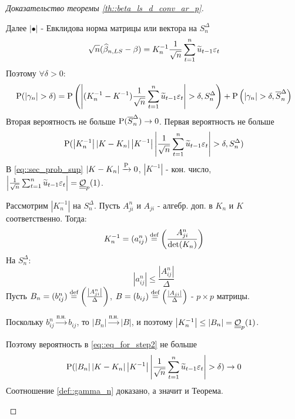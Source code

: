 \begin{proof}[Доказательство теоремы \ref{th::beta_ls_d_conv_ar_p}]
\begin{enumerate}
        Далее $\left\lvert \bullet\right\rvert $ - Евклидова норма матрицы или вектора на $S_n^\Delta$
        \[\sqrt{n}(\widehat{\beta}_{n,LS}-\beta)=K^{-1}_n\frac{1}{\sqrt{n}}\sum_{t=1}^n\widetilde{u}_{t-1}\eps_t\]
        Поэтому $\forall\delta>0$:
        \[\P(\left\lvert \gamma_n\right\rvert >\delta)=\P\left(\left\lvert (K^{-1}_n-K^{-1})\frac{1}{\sqrt{n}}\sum_{t=1}^n\widetilde{u}_{t-1}\eps_t\right\rvert >\delta,S_n^\Delta\right)+\P\left(\left\lvert \gamma_n\right\rvert >\delta,\overline{S}_n^\Delta\right)\]
        Вторая вероятность не больше $\P(\overline{S}_n^\Delta)\rightarrow0$. Первая вероятность
        не больше
        \begin{equation} \label{eq::sec_prob_sup}
            \P(\left\lvert K_n^{-1}\right\rvert \left\lvert K-K_n\right\rvert \left\lvert K^{-1}\right\rvert \left\lvert \frac{1}{\sqrt{n}}\sum_{t=1}^n\widetilde{u}_{t-1}\eps_t\right\rvert >\delta, S_n^\Delta)
        \end{equation}
        В \eqref{eq::sec_prob_sup} $\left\lvert K-K_n\right\rvert \xrightarrow{\P}0$, $\left\lvert K^{-1}\right\rvert $ - кон. число, $\left\lvert \frac{1}{\sqrt{n}}\sum_{t=1}^n\widetilde{u}_{t-1}\eps_t\right\rvert =\bigO_p(1)$.

        Рассмотрим $\left\lvert K_n^{-1}\right\rvert $ на $S_n^\Delta$. Пусть $A_{ji}^n$ и $A_{ji}$ - алгебр. доп. в $K_n$ и $K$ соответственно.
        Тогда:
        \[K_n^{-1}=(a_{ij}^n)\defeq\left(\frac{A_{ji}^n}{\det(K_n)}\right)\]
        На $S_n^\Delta$:
        \[\left\lvert a^n_{ij}\right\rvert \leq\frac{\left\lvert A_{ij}^n\right\rvert }{\Delta}\]
        Пусть $B_n=(b_{ij}^n)\defeq\left(\frac{\left\lvert A_{ji}^n\right\rvert }{\Delta}\right)$, $B=(b_{ij})\defeq\left(\frac{\left\lvert A_{ji}\right\rvert }{\Delta}\right)$ - $p\times p$ матрицы.

        Поскольку $b^n_{ij}\xrightarrow{\text{п.н.}}b_{ij}$, то $\left\lvert B_n\right\rvert \xrightarrow{\text{п.н.}}\left\lvert B\right\rvert $,
        и поэтому $\left\lvert K_n^{-1}\right\rvert \leq\left\lvert B_n\right\rvert =\bigO_p(1)$.

        Поэтому вероятность в \eqref{eq::eq_for_step2} не больше
        \[\P(\left\lvert B_n\right\rvert \left\lvert K-K_n\right\rvert \left\lvert K^{-1}\right\rvert \left\lvert \frac{1}{\sqrt{n}}\sum_{t=1}^n\widetilde{u}_{t-1}\eps_t\right\rvert >\delta)\rightarrow0\]
        Соотношение \eqref{def::gamma_n} доказано, а значит и Теорема.
    \end{enumerate}
\end{proof}

